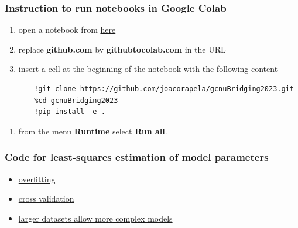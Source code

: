 \begin{frame}[fragile]
    \frametitle{Instruction to run notebooks in Google Colab}

    \begin{enumerate}
        \item open a notebook from
            \href{https://github.com/joacorapela/gcnuBridging2023/tree/master/docs/sphinx/build/html/notebooks/auto_examples/bayesianLinearRegression}{here}
        \item replace \textbf{github.com} by \textbf{githubtocolab.com} in the
            URL
        \item insert a cell at the beginning of the notebook with the following
            content
        \seti
    \end{enumerate}

    \tiny
    \begin{verbatim}
       !git clone https://github.com/joacorapela/gcnuBridging2023.git
       %cd gcnuBridging2023
       !pip install -e .
    \end{verbatim}
    \normalsize

    \begin{enumerate}
        \conti
        \item from the menu \textbf{Runtime} select \textbf{Run all}.
    \end{enumerate}
\end{frame}

\begin{frame}
    \frametitle{Code for least-squares estimation of model parameters}

    \begin{itemize}
        \item \href{https://joacorapela.github.io/gcnuBridging2023/auto\_examples/bayesianLinearRegression/plotOverfittingLeastSquares.html\#sphx-glr-auto-examples-bayesianlinearregression-plotoverfittingleastsquares-py}{overfitting}
        \item \href{https://joacorapela.github.io/gcnuBridging2023/auto\_examples/bayesianLinearRegression/plotCrossValidationLeastSquares.html\#sphx-glr-auto-examples-bayesianlinearregression-plotcrossvalidationleastsquares-py}{cross validation}
        \item \href{https://joacorapela.github.io/gcnuBridging2023/auto\_examples/bayesianLinearRegression/plotLackOfOverfittingInLeastSquaresForLargerDatasetSize.html\#sphx-glr-auto-examples-bayesianlinearregression-plotlackofoverfittinginleastsquaresforlargerdatasetsize-py}{larger datasets allow more complex models}
    \end{itemize}

\end{frame}

